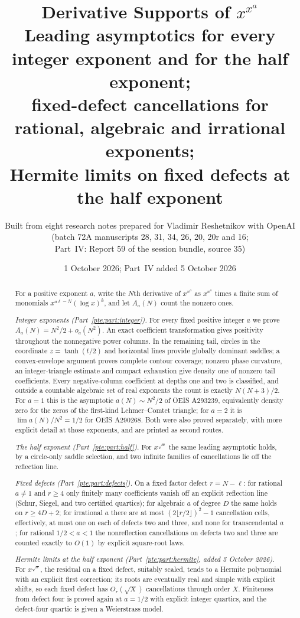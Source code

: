 \documentclass[11pt,a4paper]{article}
\title{Derivative Supports of $x^{x^a}$\\[4pt]\large Leading asymptotics for every integer exponent and for the half exponent;\\ fixed-defect cancellations for rational, algebraic and irrational exponents;\\ Hermite limits on fixed defects at the half exponent}
\author{Built from eight research notes prepared for Vladimir Reshetnikov with OpenAI\\(batch 72A manuscripts 28, 31, 34, 26, 20, 20r and 16;\\ Part~IV: Report 59 of the session bundle, source 35)}
\date{1 October 2026; Part~IV added 5 October 2026}
\numberwithin{equation}{section}
\theoremstyle{definition}
\theoremstyle{plain}
\begin{document}
\hypersetup{pageanchor=false}
\begin{titlepage}
\maketitle
\thispagestyle{empty}
\begin{abstract}
For a positive exponent $a$, write the $N$th derivative of $x^{x^a}$ as $x^{x^a}$ times a finite sum of monomials $x^{a\ell-N}(\log x)^k$, and let $A_a(N)$ count the nonzero ones.

\emph{Integer exponents (Part~\ref{pte:part:integer}).} For every fixed positive integer $a$ we prove $A_a(N)=N^2/2+o_a(N^2)$. An exact coefficient transformation gives positivity throughout the nonnegative power columns. In the remaining tail, circles in the coordinate $z=\tanh(t/2)$ and horizontal lines provide globally dominant saddles; a convex-envelope argument proves complete contour coverage; nonzero phase curvature, an integer-triangle estimate and compact exhaustion give density one of nonzero tail coefficients. Every negative-column coefficient at depths one and two is classified, and outside a countable algebraic set of real exponents the count is exactly $N(N+3)/2$. For $a=1$ this is the asymptotic $a(N)\sim N^2/2$ of OEIS A293239, equivalently density zero for the zeros of the first-kind Lehmer--Comtet triangle; for $a=2$ it is $\lim a(N)/N^2=1/2$ for OEIS A290268. Both were also proved separately, with more explicit detail at those exponents, and are printed as second routes.

\emph{The half exponent (Part~\ref{pte:part:half}).} For $x^{\sqrt x}$ the same leading asymptotic holds, by a circle-only saddle selection, and two infinite families of cancellations lie off the reflection line.

\emph{Fixed defects (Part~\ref{pte:part:defects}).} On a fixed factor defect $r=N-\ell$: for rational $a\ne1$ and $r\ge4$ only finitely many coefficients vanish off an explicit reflection line (Schur, Siegel, and two certified quartics); for algebraic $a$ of degree $D$ the same holds on $r\ge4D+2$; for irrational $a$ there are at most $(2\lfloor r/2\rfloor)^2-1$ cancellation cells, effectively, at most one on each of defects two and three, and none for transcendental $a$; for rational $1/2<a<1$ the nonreflection cancellations on defects two and three are counted exactly to $O(1)$ by explicit square-root laws.

\emph{Hermite limits at the half exponent (Part~\ref{pte:part:hermite}, added 5 October 2026).} For $x^{\sqrt x}$, the residual on a fixed defect, suitably scaled, tends to a Hermite polynomial with an explicit first correction; its roots are eventually real and simple with explicit shifts, so each fixed defect has $O_r(\sqrt X)$ cancellations through order $X$. Finiteness from defect four is proved again at $a=1/2$ with explicit integer quartics, and the defect-four quartic is given a Weierstrass model.


\end{abstract}
\end{titlepage}
\end{document}

